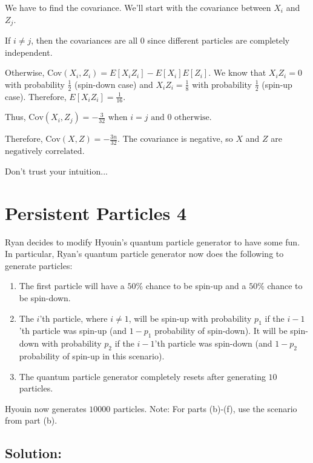 \documentclass{article}
\begin{document}
\begin{enumerate}[label=(\alph*)]
    We have to find the covariance. We'll start with the covariance between $X_i$ and $Z_j$.
    
    If $i \neq j$, then the covariances are all $0$ since different particles are completely independent.
    
    Otherwise, Cov$(X_i, Z_i) = E[X_iZ_i] - E[X_i]E[Z_i]$. We know that $X_iZ_i = 0$ with probability $\frac{1}{2}$ (spin-down case) and $X_iZ_i = \frac{1}{8}$ with probability $\frac{1}{2}$ (spin-up case). Therefore, $E[X_iZ_i] = \frac{1}{16}$.
    
    Thus, $\text{Cov}(X_i, Z_j) = -\frac{3}{32} \text{ when } i = j \text{ and 0 otherwise.}$
    
    Therefore, $\text{Cov}(X, Z) = -\frac{3n}{32}$. The covariance is negative, so $X$ and $Z$ are $\boxed{\text{negatively correlated}}$.
    
    Don't trust your intuition...
\end{enumerate}

\newpage

\section{Persistent Particles 4}

Ryan decides to modify Hyouin's quantum particle generator to have some fun. In particular, Ryan's quantum particle generator now does the following to generate particles:

\begin{enumerate}
    \item The first particle will have a $50\%$ chance to be spin-up and a $50\%$ chance to be spin-down.
    \item The $i$'th particle, where $i \neq 1$, will be spin-up with probability $p_1$ if the $i-1$'th particle was spin-up (and $1-p_1$ probability of spin-down). It will be spin-down with probability $p_2$ if the $i-1$'th particle was spin-down (and $1-p_2$ probability of spin-up in this scenario).
    \item The quantum particle generator completely resets after generating $10$ particles.
\end{enumerate}

Hyouin now generates $10000$ particles. Note: For parts (b)-(f), use the scenario from part (b).

\subsection{Solution:}
\end{document}
